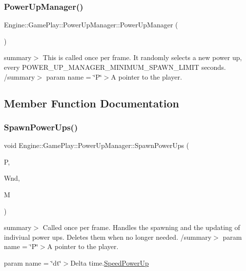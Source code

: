 \subsubsection{\texorpdfstring{Power\+Up\+Manager()}{PowerUpManager()}}
{\footnotesize\ttfamily Engine\+::\+Game\+Play\+::\+Power\+Up\+Manager\+::\+Power\+Up\+Manager (\begin{DoxyParamCaption}{ }\end{DoxyParamCaption})}

summary$>$ This is called once per frame. It randomly selects a new power up, every P\+O\+W\+E\+R\+\_\+\+U\+P\+\_\+\+M\+A\+N\+A\+G\+E\+R\+\_\+\+M\+I\+N\+I\+M\+U\+M\+\_\+\+S\+P\+A\+W\+N\+\_\+\+L\+I\+M\+IT seconds. /summary$>$ param name = \char`\"{}\+P\char`\"{}$>$A pointer to the player.

\subsection{Member Function Documentation}
\mbox{\label{class_engine_1_1_game_play_1_1_power_up_manager_aed4a80a6633ffcf652c05b568d299459}} 
\subsubsection{\texorpdfstring{Spawn\+Power\+Ups()}{SpawnPowerUps()}}
{\footnotesize\ttfamily void Engine\+::\+Game\+Play\+::\+Power\+Up\+Manager\+::\+Spawn\+Power\+Ups (\begin{DoxyParamCaption}\item[{\hyperlink{class_engine_1_1_game_play_1_1_player}{Player} $\ast$}]{P,  }\item[{Render\+Window $\ast$}]{Wnd,  }\item[{\hyperlink{class_engine_1_1_core_1_1_map}{Map}}]{M }\end{DoxyParamCaption})}

summary$>$ Called once per frame. Handles the spawning and the updating of indiviual power ups. Deletes them when no longer needed. /summary$>$ param name = \char`\"{}\+P\char`\"{}$>$A pointer to the player.

param name = \char`\"{}dt\char`\"{}$>$Delta time.\hyperlink{class_engine_1_1_game_play_1_1_speed_power_up}{Speed\+Power\+Up}

